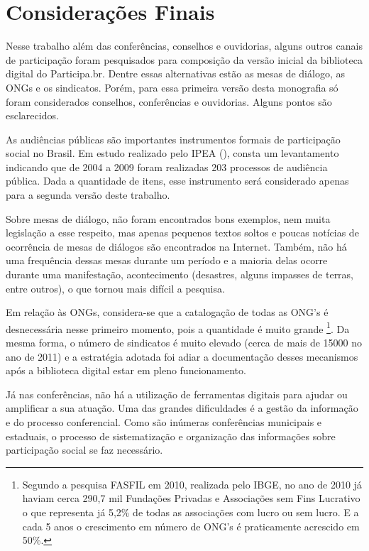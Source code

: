 \chapter{Considerações Finais}

Nesse trabalho além das conferências, conselhos e ouvidorias, alguns outros canais de participação foram pesquisados para composição da versão inicial da biblioteca digital do Participa.br. Dentre essas alternativas estão as mesas de diálogo, as ONGs e os sindicatos. Porém, para essa primeira versão desta monografia só foram considerados conselhos, conferências e ouvidorias. Alguns pontos são esclarecidos.

As audiências públicas são importantes instrumentos formais de participação social no Brasil. Em estudo realizado pelo IPEA (\citeyear{ipea2013audiencia}), consta um levantamento indicando que de 2004 a 2009 foram realizadas 203 processos de audiência pública. Dada a quantidade de itens, esse instrumento será considerado apenas para a segunda versão deste trabalho.

Sobre mesas de diálogo, não foram encontrados bons exemplos, nem muita legislação a esse respeito, mas apenas pequenos textos soltos e poucas notícias de ocorrência de mesas de diálogos são encontrados na Internet. Também, não há uma frequência dessas mesas durante um período e a maioria delas ocorre durante uma manifestação, acontecimento (desastres, alguns impasses de terras, entre outros), o que tornou mais difícil a pesquisa.

Em relação às ONGs, considera-se que a catalogação de todas as ONG’s é desnecessária nesse primeiro momento, pois a quantidade é muito grande  \cite{ibge2012ongs} \footnote{Segundo a pesquisa FASFIL em 2010, realizada pelo IBGE, no ano de 2010 já haviam cerca 290,7 mil Fundações Privadas e Associações sem Fins Lucrativo o que representa já 5,2\% de todas as associações com lucro ou sem lucro. E a cada 5 anos o crescimento em número de ONG’s é praticamente acrescido em 50\%.}. Da mesma forma, o número de sindicatos é muito elevado (cerca de mais de 15000 no ano de 2011) e a estratégia adotada foi adiar a documentação desses mecanismos após a biblioteca digital estar em pleno funcionamento.

Já nas conferências, não há a utilização de ferramentas digitais para ajudar ou amplificar a sua atuação. Uma das grandes dificuldades é a gestão da informação e do processo conferencial. Como são inúmeras conferências municipais e estaduais, o processo de sistematização e organização das informações sobre participação social se faz necessário. 

